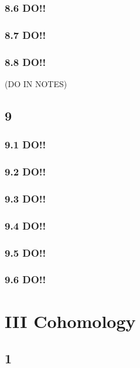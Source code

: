 \documentclass[12pt]{article}
\begin{document}
\subsubsection{8.6 DO!!}

\subsubsection{8.7 DO!!}

\subsubsection{8.8 DO!!}

(DO IN NOTES)

\subsection{9}

\subsubsection{9.1 DO!!}

\subsubsection{9.2 DO!!}

\subsubsection{9.3 DO!!}

\subsubsection{9.4 DO!!}

\subsubsection{9.5 DO!!}

\subsubsection{9.6 DO!!}


\section{III Cohomology}

\subsection{1}
\end{document}
